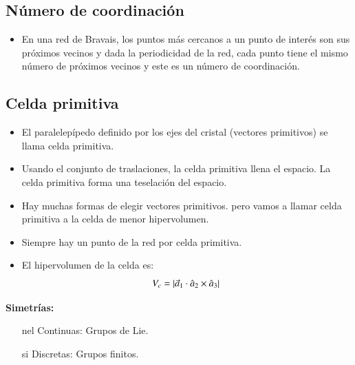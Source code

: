 \subsection{Número de coordinación}

\begin{itemize}
    \item En una red de Bravais, los puntos más cercanos a un punto de interés son sus próximos vecinos y dada la periodicidad de la red, cada punto tiene el mismo número de próximos vecinos y este es un número de coordinación.
\end{itemize}

\subsection{Celda primitiva}

\begin{itemize}
    \item El paralelepípedo definido por los ejes del cristal (vectores primitivos) se llama celda primitiva.
    \item Usando el conjunto de traslaciones, la celda primitiva llena el espacio. La celda primitiva forma una teselación del espacio.
    \item Hay muchas formas de elegir vectores primitivos. pero vamos a llamar celda primitiva a la celda de menor hipervolumen.
    \item Siempre hay un punto de la red por celda primitiva.
    \item El hipervolumen de la celda es:
    $$V_c=\abs*{\vec{a}_1\cdot\hat{a}_2\times\hat{a}_3}$$
\end{itemize}

\textbf{Simetrías:}

\begin{itemize}
    \item[nel] Continuas: Grupos de Lie.
    \item[si] Discretas: Grupos finitos.
\end{itemize}



